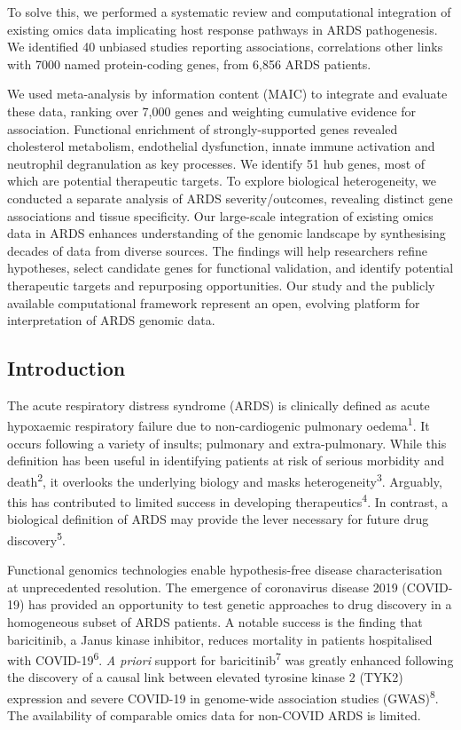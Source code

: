 \documentclass[
  11,
  a4paper,
]{article}
\begin{document}
To solve this, we performed a systematic review and computational
integration of existing omics data implicating host response pathways in
ARDS pathogenesis. We identified 40 unbiased studies reporting
associations, correlations other links with 7000 named protein-coding
genes, from 6,856 ARDS patients.

We used meta-analysis by information content (MAIC) to integrate and
evaluate these data, ranking over 7,000 genes and weighting cumulative
evidence for association. Functional enrichment of strongly-supported
genes revealed cholesterol metabolism, endothelial dysfunction, innate
immune activation and neutrophil degranulation as key processes. We
identify 51 hub genes, most of which are potential therapeutic targets.
To explore biological heterogeneity, we conducted a separate analysis of
ARDS severity/outcomes, revealing distinct gene associations and tissue
specificity. Our large-scale integration of existing omics data in ARDS
enhances understanding of the genomic landscape by synthesising decades
of data from diverse sources. The findings will help researchers refine
hypotheses, select candidate genes for functional validation, and
identify potential therapeutic targets and repurposing opportunities.
Our study and the publicly available computational framework represent
an open, evolving platform for interpretation of ARDS genomic data.

\newpage

\subsection{Introduction}\label{introduction}

The acute respiratory distress syndrome (ARDS) is clinically defined as
acute hypoxaemic respiratory failure due to non-cardiogenic pulmonary
oedema\textsuperscript{1}. It occurs following a variety of insults;
pulmonary and extra-pulmonary. While this definition has been useful in
identifying patients at risk of serious morbidity and
death\textsuperscript{2}, it overlooks the underlying biology and masks
heterogeneity\textsuperscript{3}. Arguably, this has contributed to
limited success in developing therapeutics\textsuperscript{4}. In
contrast, a biological definition of ARDS may provide the lever
necessary for future drug discovery\textsuperscript{5}.

Functional genomics technologies enable hypothesis-free disease
characterisation at unprecedented resolution. The emergence of
coronavirus disease 2019 (COVID-19) has provided an opportunity to test
genetic approaches to drug discovery in a homogeneous subset of ARDS
patients. A notable success is the finding that baricitinib, a Janus
kinase inhibitor, reduces mortality in patients hospitalised with
COVID-19\textsuperscript{6}. \emph{A priori} support for
baricitinib\textsuperscript{7} was greatly enhanced following the
discovery of a causal link between elevated tyrosine kinase 2 (TYK2)
expression and severe COVID-19 in genome-wide association studies
(GWAS)\textsuperscript{8}. The availability of comparable omics data for
non-COVID ARDS is limited.
\end{document}

